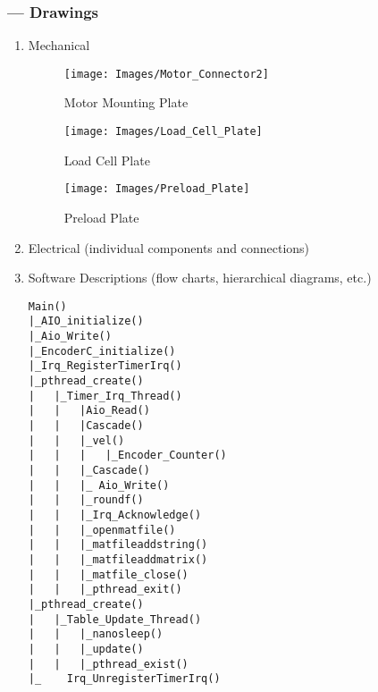 \subsubsection*{ --- Drawings}
\begin{enumerate}
\item{Mechanical}

\begin{figure}[H]
\centering
\texttt{[image: Images/Motor\_Connector2]}
\caption{Motor Mounting Plate}
\label{fig:Motor_Connector2}
\end{figure}

\begin{figure}[H]
\centering
\texttt{[image: Images/Load\_Cell\_Plate]}
\caption{Load Cell Plate}
\label{fig:Load_Cell_Plate}
\end{figure}

\begin{figure}[H]
\centering
\texttt{[image: Images/Preload\_Plate]}
\caption{Preload Plate}
\label{fig:Preload_Plate}
\end{figure}


\item{Electrical (individual components and connections)}

\item{Software Descriptions (flow charts, hierarchical diagrams, etc.)}

\begin{verbatim}
Main()
|_AIO_initialize()
|_Aio_Write()
|_EncoderC_initialize()
|_Irq_RegisterTimerIrq()
|_pthread_create()
|	|_Timer_Irq_Thread()
|	|	|Aio_Read()
|	|	|Cascade()
|	|	|_vel()
|	|	|	|_Encoder_Counter()
|	|	|_Cascade()
|	|	|_ Aio_Write()
|   |	|_roundf()
|	|	|_Irq_Acknowledge()
|	|	|_openmatfile()
|	|	|_matfileaddstring()
|	|	|_matfileaddmatrix()
|	|	|_matfile_close()
|   |	|_pthread_exit()
|_pthread_create()
|	|_Table_Update_Thread()
|	|	|_nanosleep()
|	|	|_update()
|	|	|_pthread_exist()
|_    Irq_UnregisterTimerIrq()
\end{verbatim}
\end{enumerate}